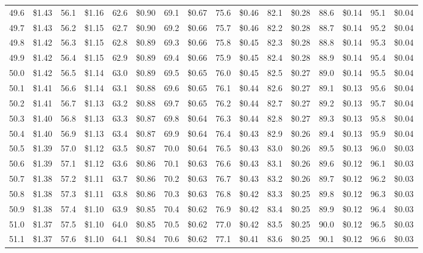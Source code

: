 \documentclass{article}
\begin{document}
\begin{tabular}{|*{8}{rr|}}
49.6 & \$1.43 & 56.1 & \$1.16 & 62.6 & \$0.90 & 69.1 & \$0.67 & 75.6 & \$0.46 & 82.1 & \$0.28 & 88.6 & \$0.14 & 95.1 & \$0.04\\
49.7 & \$1.43 & 56.2 & \$1.15 & 62.7 & \$0.90 & 69.2 & \$0.66 & 75.7 & \$0.46 & 82.2 & \$0.28 & 88.7 & \$0.14 & 95.2 & \$0.04\\
49.8 & \$1.42 & 56.3 & \$1.15 & 62.8 & \$0.89 & 69.3 & \$0.66 & 75.8 & \$0.45 & 82.3 & \$0.28 & 88.8 & \$0.14 & 95.3 & \$0.04\\
49.9 & \$1.42 & 56.4 & \$1.15 & 62.9 & \$0.89 & 69.4 & \$0.66 & 75.9 & \$0.45 & 82.4 & \$0.28 & 88.9 & \$0.14 & 95.4 & \$0.04\\
50.0 & \$1.42 & 56.5 & \$1.14 & 63.0 & \$0.89 & 69.5 & \$0.65 & 76.0 & \$0.45 & 82.5 & \$0.27 & 89.0 & \$0.14 & 95.5 & \$0.04\\
50.1 & \$1.41 & 56.6 & \$1.14 & 63.1 & \$0.88 & 69.6 & \$0.65 & 76.1 & \$0.44 & 82.6 & \$0.27 & 89.1 & \$0.13 & 95.6 & \$0.04\\
50.2 & \$1.41 & 56.7 & \$1.13 & 63.2 & \$0.88 & 69.7 & \$0.65 & 76.2 & \$0.44 & 82.7 & \$0.27 & 89.2 & \$0.13 & 95.7 & \$0.04\\
50.3 & \$1.40 & 56.8 & \$1.13 & 63.3 & \$0.87 & 69.8 & \$0.64 & 76.3 & \$0.44 & 82.8 & \$0.27 & 89.3 & \$0.13 & 95.8 & \$0.04\\
50.4 & \$1.40 & 56.9 & \$1.13 & 63.4 & \$0.87 & 69.9 & \$0.64 & 76.4 & \$0.43 & 82.9 & \$0.26 & 89.4 & \$0.13 & 95.9 & \$0.04\\
50.5 & \$1.39 & 57.0 & \$1.12 & 63.5 & \$0.87 & 70.0 & \$0.64 & 76.5 & \$0.43 & 83.0 & \$0.26 & 89.5 & \$0.13 & 96.0 & \$0.03\\
50.6 & \$1.39 & 57.1 & \$1.12 & 63.6 & \$0.86 & 70.1 & \$0.63 & 76.6 & \$0.43 & 83.1 & \$0.26 & 89.6 & \$0.12 & 96.1 & \$0.03\\
50.7 & \$1.38 & 57.2 & \$1.11 & 63.7 & \$0.86 & 70.2 & \$0.63 & 76.7 & \$0.43 & 83.2 & \$0.26 & 89.7 & \$0.12 & 96.2 & \$0.03\\
50.8 & \$1.38 & 57.3 & \$1.11 & 63.8 & \$0.86 & 70.3 & \$0.63 & 76.8 & \$0.42 & 83.3 & \$0.25 & 89.8 & \$0.12 & 96.3 & \$0.03\\
50.9 & \$1.38 & 57.4 & \$1.10 & 63.9 & \$0.85 & 70.4 & \$0.62 & 76.9 & \$0.42 & 83.4 & \$0.25 & 89.9 & \$0.12 & 96.4 & \$0.03\\
51.0 & \$1.37 & 57.5 & \$1.10 & 64.0 & \$0.85 & 70.5 & \$0.62 & 77.0 & \$0.42 & 83.5 & \$0.25 & 90.0 & \$0.12 & 96.5 & \$0.03\\
51.1 & \$1.37 & 57.6 & \$1.10 & 64.1 & \$0.84 & 70.6 & \$0.62 & 77.1 & \$0.41 & 83.6 & \$0.25 & 90.1 & \$0.12 & 96.6 & \$0.03\\

\end{tabular}
\end{document}
